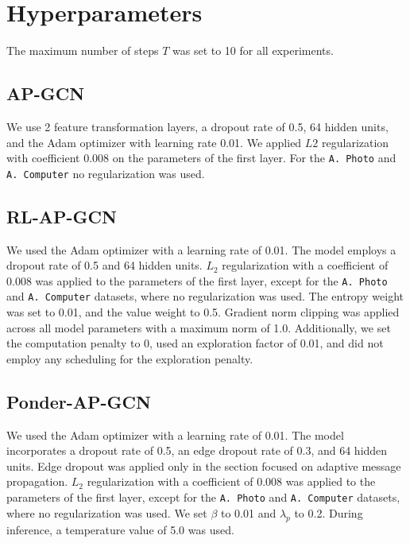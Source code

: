 \documentclass{gdl}
\begin{document}
\clearpage


\clearpage

\appendix

\section{Hyperparameters}
The maximum number of steps $T$ was set to 10 for all experiments.

\subsection{AP-GCN}
\label{lab:hyper-ap-gcn}
We use 2 feature transformation layers, a dropout rate of 0.5, 64 hidden units, and the Adam optimizer with learning rate 0.01. We applied $L2$ regularization with coefficient 0.008 on the parameters of the first layer. For the \texttt{A. Photo} and \texttt{A. Computer} no regularization was used.

\subsection{RL-AP-GCN}
\label{lab:hyper-rl-gcn}
We used the Adam optimizer with a learning rate of 0.01. The model employs a dropout rate of 0.5 and 64 hidden units. $L_2$ regularization with a coefficient of 0.008 was applied to the parameters of the first layer, except for the \texttt{A. Photo} and \texttt{A. Computer} datasets, where no regularization was used. The entropy weight was set to 0.01, and the value weight to 0.5. Gradient norm clipping was applied across all model parameters with a maximum norm of 1.0. Additionally, we set the computation penalty to 0, used an exploration factor of 0.01, and did not employ any scheduling for the exploration penalty.

\subsection{Ponder-AP-GCN}
\label{lab:hyper-ponder-gcn}
We used the Adam optimizer with a learning rate of 0.01. The model incorporates a dropout rate of 0.5, an edge dropout rate of 0.3, and 64 hidden units. Edge dropout was applied only in the section focused on adaptive message propagation. $L_2$ regularization with a coefficient of 0.008 was applied to the parameters of the first layer, except for the \texttt{A. Photo} and \texttt{A. Computer} datasets, where no regularization was used. We set $\beta$ to 0.01 and $\lambda_p$ to 0.2. During inference, a temperature value of 5.0 was used.
\end{document}
